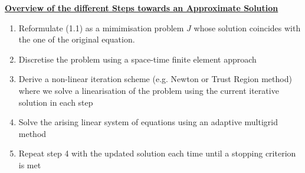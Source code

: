 \documentclass[../draft_1.tex]{subfiles}
\begin{document}
\begin{framed}
	\underline{\textbf{Overview of the different Steps towards an Approximate Solution}} 
	
	\begin{enumerate}
		\item  Reformulate (1.1) as a mimimisation problem $J$ whose solution coincides with the one of the original equation. 
		\item Discretise the problem using a space-time finite element approach
		\item Derive a non-linear iteration scheme (e.g. Newton or Trust Region method) where we solve a linearisation of the problem using the current iterative solution in each step
		\item  Solve the arising linear system of equations using an adaptive multigrid method
		\item Repeat step 4 with the updated solution each time until a stopping criterion is met 
	\end{enumerate}	
\end{framed}
\end{document}
